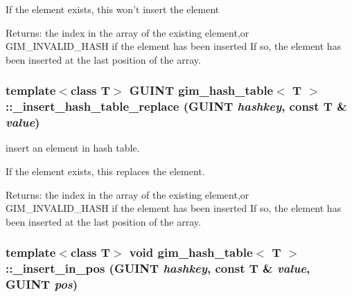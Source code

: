 If the element exists, this won't insert the element \begin{Desc}
\item[Returns:]the index in the array of the existing element,or GIM\_\-INVALID\_\-HASH if the element has been inserted If so, the element has been inserted at the last position of the array. \end{Desc}
\hypertarget{classgim__hash__table_6ebfb7415bd946855ec5730651f7c191}{
\subsubsection[\_\-insert\_\-hash\_\-table\_\-replace]{\setlength{\rightskip}{0pt plus 5cm}template$<$class T$>$ GUINT {\bf gim\_\-hash\_\-table}$<$ T $>$::\_\-insert\_\-hash\_\-table\_\-replace (GUINT {\em hashkey}, \/  const T \& {\em value})}}
\label{classgim__hash__table_6ebfb7415bd946855ec5730651f7c191}


insert an element in hash table. 

If the element exists, this replaces the element. \begin{Desc}
\item[Returns:]the index in the array of the existing element,or GIM\_\-INVALID\_\-HASH if the element has been inserted If so, the element has been inserted at the last position of the array. \end{Desc}
\hypertarget{classgim__hash__table_3eacaf88e1b18815c0b89d368d77a93a}{
\subsubsection[\_\-insert\_\-in\_\-pos]{\setlength{\rightskip}{0pt plus 5cm}template$<$class T$>$ void {\bf gim\_\-hash\_\-table}$<$ T $>$::\_\-insert\_\-in\_\-pos (GUINT {\em hashkey}, \/  const T \& {\em value}, \/  GUINT {\em pos})}}
\label{classgim__hash__table_3eacaf88e1b18815c0b89d368d77a93a}


